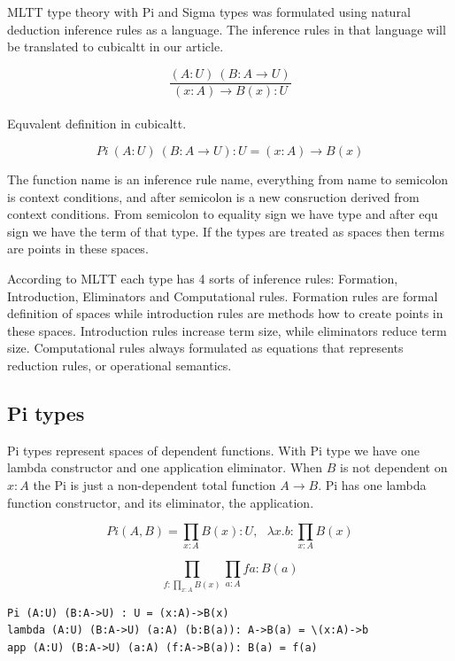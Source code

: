 \documentclass{svproc}
\begin{document}
MLTT type theory with Pi and Sigma types was formulated using
natural deduction inference rules as a language.
The inference rules in that language will
be translated to cubicaltt in our article.

\begin{equation}
\tag{natural deduction}
\dfrac
{(A: U)\ (B: A \rightarrow U)}
{(x: A) \rightarrow B(x): U}
\end{equation}
\\
Equvalent definition in cubicaltt.

\begin{equation}
\tag{cubicaltt}
Pi\ (A: U)\ (B: A \rightarrow U): U = (x: A) \rightarrow B(x)
\end{equation}

The function name is an inference rule name,
everything from name to semicolon is context conditions,
and after semicolon is a new consruction derived from context conditions.
From semicolon to equality sign we have type and after
equ sign we have the term of that type.
If the types are treated as spaces then terms are points in these spaces.

According to MLTT each type has 4 sorts of inference rules:
Formation, Introduction, Eliminators and Computational rules.
Formation rules are formal definition of spaces while introduction rules
are methods how to create points in these spaces. Introduction rules increase term size,
while eliminators reduce term size. Computational rules always
formulated as equations that represents reduction rules,
or operational semantics.

\subsection{Pi types}

Pi types represent spaces of dependent functions.
With Pi type we have one lambda constructor
and one application eliminator. When $B$ is not dependent on $x:A$
the Pi is just a non-dependent total function $A \rightarrow B$.
Pi has one lambda function constructor, and its eliminator, the application.

$$Pi(A,B) = \prod_{x:A} B(x) : U,\ \ \ 
  \lambda x . b : \prod_{x:A} B(x)$$

$$\prod_{f:\prod_{x:A}B(x)}\prod_{a:A} f a : B (a)$$

\begin{lstlisting}[mathescape=true]
Pi (A:U) (B:A->U) : U = (x:A)->B(x)
lambda (A:U) (B:A->U) (a:A) (b:B(a)): A->B(a) = \(x:A)->b
app (A:U) (B:A->U) (a:A) (f:A->B(a)): B(a) = f(a)
\end{lstlisting}
\end{document}
